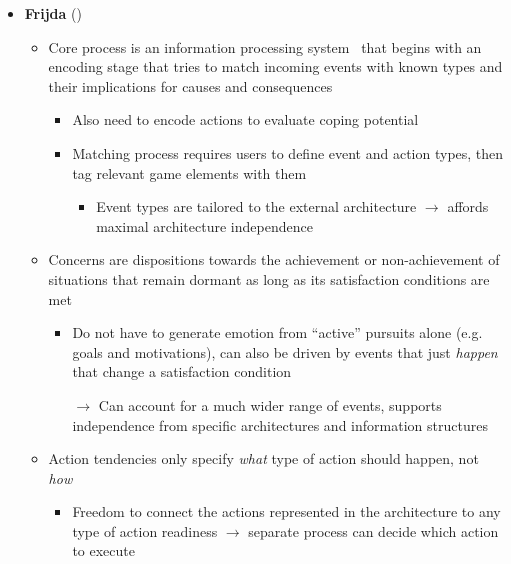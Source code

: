 \begin{itemize}
    \item \textbf{Frijda} (\strong)
    \begin{itemize}
        \item Core process is an information processing
        system~\citep[p.~453--456]{frijda1986emotions} that begins with an
        encoding stage that tries to match incoming events with known types and
        their implications for causes and consequences
        \begin{itemize}
            \item Also need to encode actions to evaluate coping potential

            \item Matching process requires users to define event and action
            types, then tag relevant game elements with them
            \begin{itemize}
                \item Event types are tailored to the external architecture
                $\rightarrow$ affords maximal architecture independence
            \end{itemize}
        \end{itemize}

        \item Concerns are dispositions towards the achievement or
        non-achievement of situations that remain dormant as long as its
        satisfaction conditions are met~\citep[p.~335--336,
        466--467]{frijda1986emotions}
        \begin{itemize}
            \item Do not have to generate emotion from ``active'' pursuits
            alone (e.g. goals and motivations), can also be driven by events
            that just \textit{happen} that change a satisfaction condition

            \item [$\rightarrow$] Can account for a much wider range of events,
            supports independence from specific architectures and information
            structures
        \end{itemize}

        \item Action tendencies only specify \textit{what} type of action should
        happen, not \textit{how}~\citep[p.~70]{frijda1986emotions}
        \begin{itemize}
            \item Freedom to connect the actions represented in the
            architecture to any type of action readiness $\rightarrow$ separate
            process can decide which action to execute


\end{itemize}
\end{itemize}
\end{itemize}
